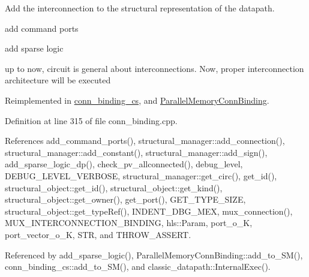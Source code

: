 Add the interconnection to the structural representation of the datapath. 

add command ports

add sparse logic

up to now, circuit is general about interconnections. Now, proper interconnection architecture will be executed 

Reimplemented in \hyperlink{classconn__binding__cs_a1ab5041953556d30503a795859c3121c}{conn\+\_\+binding\+\_\+cs}, and \hyperlink{classParallelMemoryConnBinding_a269ef0bbe0925ec814787b9d3b5a54bf}{Parallel\+Memory\+Conn\+Binding}.



Definition at line 315 of file conn\+\_\+binding.\+cpp.



References add\+\_\+command\+\_\+ports(), structural\+\_\+manager\+::add\+\_\+connection(), structural\+\_\+manager\+::add\+\_\+constant(), structural\+\_\+manager\+::add\+\_\+sign(), add\+\_\+sparse\+\_\+logic\+\_\+dp(), check\+\_\+pv\+\_\+allconnected(), debug\+\_\+level, D\+E\+B\+U\+G\+\_\+\+L\+E\+V\+E\+L\+\_\+\+V\+E\+R\+B\+O\+SE, structural\+\_\+manager\+::get\+\_\+circ(), get\+\_\+id(), structural\+\_\+object\+::get\+\_\+id(), structural\+\_\+object\+::get\+\_\+kind(), structural\+\_\+object\+::get\+\_\+owner(), get\+\_\+port(), G\+E\+T\+\_\+\+T\+Y\+P\+E\+\_\+\+S\+I\+ZE, structural\+\_\+object\+::get\+\_\+type\+Ref(), I\+N\+D\+E\+N\+T\+\_\+\+D\+B\+G\+\_\+\+M\+EX, mux\+\_\+connection(), M\+U\+X\+\_\+\+I\+N\+T\+E\+R\+C\+O\+N\+N\+E\+C\+T\+I\+O\+N\+\_\+\+B\+I\+N\+D\+I\+NG, hls\+::\+Param, port\+\_\+o\+\_\+K, port\+\_\+vector\+\_\+o\+\_\+K, S\+TR, and T\+H\+R\+O\+W\+\_\+\+A\+S\+S\+E\+RT.



Referenced by add\+\_\+sparse\+\_\+logic(), Parallel\+Memory\+Conn\+Binding\+::add\+\_\+to\+\_\+\+S\+M(), conn\+\_\+binding\+\_\+cs\+::add\+\_\+to\+\_\+\+S\+M(), and classic\+\_\+datapath\+::\+Internal\+Exec().

